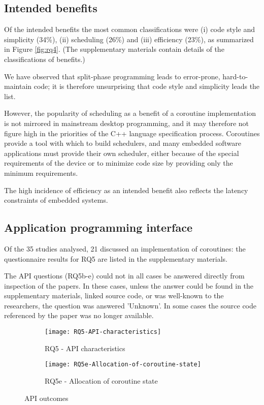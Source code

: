 \subsection{Intended benefits}

Of the intended benefits the most common classifications were (i) code style and simplicity (34\%), (ii) scheduling (26\%) and (iii) efficiency (23\%), as summarized in Figure \ref{fig:rq4}. (The supplementary materials contain details of the classifications of benefits.)

We have observed that split-phase programming leads to error-prone, hard-to-maintain code; it is therefore unsurprising that code style and simplicity leads the list.

However, the popularity of scheduling as a benefit of a coroutine implementation is not mirrored in mainstream desktop programming, and it may therefore not figure high in the priorities of the C++ language specification process. Coroutines provide a tool with which to build schedulers, and many embedded software applications must provide their own scheduler, either because of the special requirements of the device \cite{Inam2011, Park2015, Susilo2009} or to minimize code size by providing only the minimum requirements.

The high incidence of efficiency as an intended benefit also reflects the latency constraints of embedded systems.

\subsection{Application programming interface}

Of the 35 studies analysed, 21 discussed an implementation of coroutines: the questionnaire results for RQ5 are listed in the supplementary materials.

The API questions (RQ5b-e) could not in all cases be answered directly from inspection of the papers. In these cases, unless the answer could be found in the supplementary materials, linked source code, or was well-known to the researchers, the question was answered 'Unknown'. In some cases the source code referenced by the paper was no longer available.

\begin{figure}[h]
	\centering
	\begin{subfigure}[h]{0.46\textwidth}
		\centering
		\texttt{[image: RQ5-API-characteristics]}
		\caption{RQ5 - API characteristics}
		\label{fig:rq5}
	\end{subfigure}
	\begin{subfigure}[h]{0.46\textwidth}
		\centering
		\texttt{[image: RQ5e-Allocation-of-coroutine-state]}
		\caption{RQ5e - Allocation of coroutine state}
		\label{fig:rq5e}
	\end{subfigure}
	\caption{API outcomes}
\end{figure}

